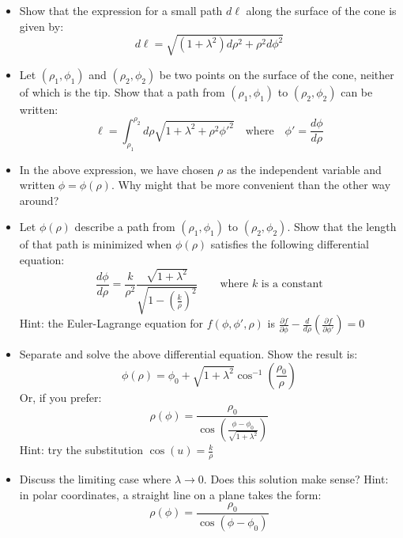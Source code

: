 \documentclass{article}
\begin{document}
\begin{itemize}
    \item Show that the expression for a small path $d\ell$ along the surface of the cone is given by:
    $$
    d\ell = \sqrt{ \left( 1 + \lambda^2 \right) d\rho^2 + \rho^2 d\phi^2}
    $$
    \item Let $(\rho_1, \phi_1)$ and $(\rho_2, \phi_2)$ be two points on the surface of the cone, neither of which is the tip. Show that a path from $(\rho_1, \phi_1)$ to $(\rho_2, \phi_2)$ can be written:
    $$
    \ell = \displaystyle \int_{\rho_1}^{\rho_2} d\rho \sqrt{1 + \lambda^2 + \rho^2 \phi'^2}
    \quad \mathrm{where} \quad
    \phi' = \frac{d\phi}{d\rho}
    $$
    \item In the above expression, we have chosen $\rho$ as the independent variable and written $\phi = \phi(\rho)$. Why might that be more convenient than the other way around?
    \item Let $\phi(\rho)$ describe a path from $(\rho_1, \phi_1)$ to $(\rho_2, \phi_2)$. Show that the length of that path is minimized when $\phi(\rho)$ satisfies the following differential equation:
    $$
    \frac{d\phi}{d\rho} = \frac{k}{\rho^2} \frac{\sqrt{1 + \lambda^2} }{\sqrt{1 - \left( \frac{k}{\rho} \right)^2}}
    \quad \quad 
    \text{where $k$ is a constant}
    $$
    Hint: the Euler-Lagrange equation for $f(\phi, \phi', \rho)$ is \; $\frac{\partial f}{\partial \phi} - \frac{d}{d \rho} \left( \frac{\partial f}{\partial \phi'} \right) = 0$
    \item Separate and solve the above differential equation. Show the result is:
    $$
    \phi(\rho) = \phi_0 + \sqrt{1 + \lambda^2} \cos^{-1} \left( \frac{\rho_0}{\rho} \right)
    $$
    Or, if you prefer:
    $$
    \rho(\phi) = \frac{\rho_0}{ \cos \left( \frac{\phi - \phi_0}{ \sqrt{1 + \lambda^2} } \right) }
    $$
    Hint: try the substitution $\cos(u) = \frac{k}{\rho}$    
    \item Discuss the limiting case where $\lambda \rightarrow 0$. Does this solution make sense?
    Hint: in polar coordinates, a straight line on a plane takes the form:
    $$
    \rho(\phi) = \frac{\rho_0}{ \cos \left( \phi - \phi_0 \right) }
    $$
\end{itemize}
\end{document}
